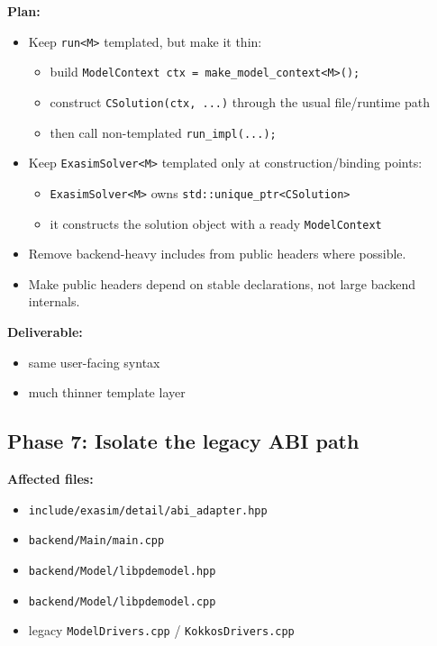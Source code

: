\documentclass[11pt]{article}
\begin{document}
\textbf{Plan:}
\begin{itemize}[leftmargin=*]
\item Keep \texttt{run<M>} templated, but make it thin:
\begin{itemize}[leftmargin=*]
\item build \texttt{ModelContext ctx = make\_model\_context<M>();}
\item construct \texttt{CSolution(ctx, ...)} through the usual file/runtime path
\item then call non-templated \texttt{run\_impl(...);}
\end{itemize}
\item Keep \texttt{ExasimSolver<M>} templated only at construction/binding points:
\begin{itemize}[leftmargin=*]
\item \texttt{ExasimSolver<M>} owns \texttt{std::unique\_ptr<CSolution>}
\item it constructs the solution object with a ready \texttt{ModelContext}
\end{itemize}
\item Remove backend-heavy includes from public headers where possible.
\item Make public headers depend on stable declarations, not large backend internals.
\end{itemize}

\textbf{Deliverable:}
\begin{itemize}[leftmargin=*]
\item same user-facing syntax
\item much thinner template layer
\end{itemize}

\subsection*{Phase 7: Isolate the legacy ABI path}

\textbf{Affected files:}
\begin{itemize}[leftmargin=*]
\item \texttt{include/exasim/detail/abi\_adapter.hpp}
\item \texttt{backend/Main/main.cpp}
\item \texttt{backend/Model/libpdemodel.hpp}
\item \texttt{backend/Model/libpdemodel.cpp}
\item legacy \texttt{ModelDrivers.cpp} / \texttt{KokkosDrivers.cpp}
\end{itemize}
\end{document}
